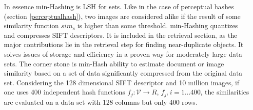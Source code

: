 \documentclass[english,12pt,a4paper,pdftex,elec,utf8, table]{aaltothesis}
\begin{document}
In essence min-Hashing is LSH for sets. Like in the case of perceptual hashes (section \ref{perceptualhash}), two images are considered alike if the result of some similarity function $sim_s$ is higher than some threshold. min-Hashing quantizes and compresses SIFT descriptors. It is included in the retrieval section, as the major contributions lie in the retrieval step for finding near-duplicate objects. It solves issues of storage and efficiency in a proven way for moderately large data sets. The corner stone is min-Hash ability to estimate document or image similarity based on a set of data significantly compressed from the original data set. Considering the 128 dimensional SIFT descriptor and 10 million images, if one uses 400 independent hash functions $f_j:\mathcal{V} \rightarrow R$, $f_j, i = 1 \ldots 400$, the similarities are evaluated on a data set with 128 columns but only 400 rows.\cite{Chum2008}
\end{document}
